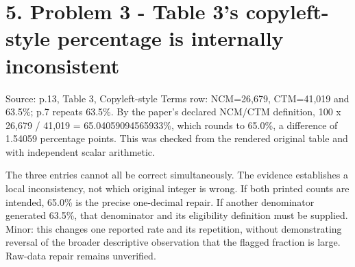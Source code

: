 \documentclass[10pt]{article}
\begin{document}
\section*{5. Problem 3 - Table 3’s copyleft-style percentage is internally inconsistent}
Source: p.13, Table 3, Copyleft-style Terms row: NCM=26,679, CTM=41,019 and 63.5\%; p.7 repeats 63.5\%. By the paper’s declared NCM/CTM definition, 100 x 26,679 / 41,019 = 65.04059094565933\%, which rounds to 65.0\%, a difference of 1.54059 percentage points. This was checked from the rendered original table and with independent scalar arithmetic.\par
The three entries cannot all be correct simultaneously. The evidence establishes a local inconsistency, not which original integer is wrong. If both printed counts are intended, 65.0\% is the precise one-decimal repair. If another denominator generated 63.5\%, that denominator and its eligibility definition must be supplied. Minor: this changes one reported rate and its repetition, without demonstrating reversal of the broader descriptive observation that the flagged fraction is large. Raw-data repair remains unverified.\par
\end{document}
